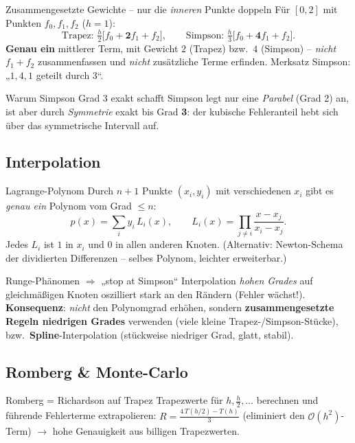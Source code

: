 \documentclass[a4paper,11pt]{article}
\begin{document}
\begin{falle}{Zusammengesetzte Gewichte -- nur die \emph{inneren} Punkte doppeln}
Für $[0,2]$ mit Punkten $f_0,f_1,f_2$ ($h=1$):
\[
  \text{Trapez: } \tfrac h2\bigl[f_0+\mathbf{2}f_1+f_2\bigr],\qquad
  \text{Simpson: } \tfrac h3\bigl[f_0+\mathbf{4}f_1+f_2\bigr].
\]
\textbf{Genau ein} mittlerer Term, mit Gewicht $2$ (Trapez) bzw.\ $4$ (Simpson) -- \emph{nicht}
$f_1+f_2$ zusammenfassen und \emph{nicht} zusätzliche Terme erfinden. Merksatz Simpson:
„$1,4,1$ geteilt durch $3$``.
\end{falle}

\begin{intu}{Warum Simpson Grad 3 exakt schafft}
Simpson legt nur eine \emph{Parabel} (Grad 2) an, ist aber durch \emph{Symmetrie} exakt bis Grad
\textbf{3}: der kubische Fehleranteil hebt sich über das symmetrische Intervall auf.
\end{intu}

\subsection{Interpolation}
\begin{satz}{Lagrange-Polynom}
Durch $n{+}1$ Punkte $(x_i,y_i)$ mit verschiedenen $x_i$ gibt es \emph{genau ein} Polynom vom Grad
$\le n$:
\[
  p(x)=\sum_{i} y_i\,L_i(x),\qquad L_i(x)=\prod_{j\neq i}\frac{x-x_j}{x_i-x_j}.
\]
Jedes $L_i$ ist $1$ in $x_i$ und $0$ in allen anderen Knoten. (Alternativ: Newton-Schema der
dividierten Differenzen -- selbes Polynom, leichter erweiterbar.)
\end{satz}

\begin{falle}{Runge-Phänomen $\Rightarrow$ „stop at Simpson``}
Interpolation \emph{hohen Grades} auf gleichmäßigen Knoten oszilliert stark an den Rändern (Fehler
wächst!). \textbf{Konsequenz}: \emph{nicht} den Polynomgrad erhöhen, sondern \textbf{zusammengesetzte
Regeln niedrigen Grades} verwenden (viele kleine Trapez-/Simpson-Stücke), bzw.\
\textbf{Spline}-Interpolation (stückweise niedriger Grad, glatt, stabil).
\end{falle}

\subsection{Romberg \& Monte-Carlo}
\begin{satz}{Romberg = Richardson auf Trapez}
Trapezwerte für $h,\tfrac h2,\dots$ berechnen und führende Fehlerterme extrapolieren:
$R=\frac{4\,T(h/2)-T(h)}{3}$ (eliminiert den $\mathcal O(h^2)$-Term) $\to$ hohe Genauigkeit aus
billigen Trapezwerten.
\end{satz}
\end{document}
